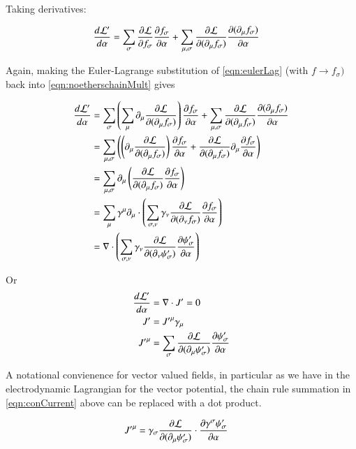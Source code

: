 \documentclass{article}
\begin{document}
Taking derivatives:

\begin{align}\label{eqn:noetherschainMult}
\frac{d\mathcal{L}'}{d\alpha}
&= \sum_\sigma \frac{\partial {\mathcal{L}}}{\partial {f_\sigma}}\frac{\partial {f_\sigma}}{\partial {\alpha}} + \sum_{\mu,\sigma} \frac{\partial {\mathcal{L}}}{\partial {(\partial_\mu f_\sigma)}}\frac{\partial {(\partial_\mu f_\sigma)}}{\partial {\alpha}}
\end{align}

Again, making the Euler-Lagrange substitution of \ref{eqn:eulerLag} (with $f\rightarrow f_\sigma)$ back into \ref{eqn:noetherschainMult} gives

\begin{align*}
\frac{d\mathcal{L}'}{d\alpha}
&= 
\sum_\sigma \left( \sum_\mu \partial_\mu \frac{\partial {\mathcal{L}}}{\partial {(\partial_\mu f_\sigma)}}\right)
\frac{\partial {f_\sigma}}{\partial {\alpha}} + \sum_{\mu,\sigma} \frac{\partial {\mathcal{L}}}{\partial {(\partial_\mu f_\sigma)}}\frac{\partial {(\partial_\mu f_\sigma)}}{\partial {\alpha}} \\
&= 
\sum_{\mu,\sigma} \left( \left( \partial_\mu \frac{\partial {\mathcal{L}}}{\partial {(\partial_\mu f_\sigma)}} \right)
\frac{\partial {f_\sigma}}{\partial {\alpha}} + \frac{\partial {\mathcal{L}}}{\partial {(\partial_\mu f_\sigma)}} \partial_\mu \frac{\partial {f_\sigma}}{\partial {\alpha}} \right) \\
&= \sum_{\mu,\sigma} \partial_\mu \left( \frac{\partial {\mathcal{L}}}{\partial {(\partial_\mu f_\sigma)}} \frac{\partial {f_\sigma}}{\partial {\alpha}} \right) \\
&= \sum_\mu \gamma^\mu \partial_\mu \cdot \left( \sum_{\sigma,\nu} \gamma_\nu \frac{\partial {\mathcal{L}}}{\partial {(\partial_\nu f_\sigma)}} \frac{\partial {f_\sigma}}{\partial {\alpha}} \right) \\
&= \nabla \cdot \left( \sum_{\sigma,\nu} \gamma_\nu \frac{\partial {\mathcal{L}}}{\partial {(\partial_\nu \psi_\sigma')}} \frac{\partial {\psi_\sigma'}}{\partial {\alpha}} \right) \\
\end{align*}

Or
\begin{align}\label{eqn:conCurrent}
\frac{d \mathcal{L}'}{d\alpha} &= \nabla \cdot J' = 0 \\
J' &= {J'}^\mu \gamma_\mu \\
{J'}^\mu &= \sum_\sigma \frac{\partial {\mathcal{L}}}{\partial {(\partial_\mu \psi_\sigma')}} \frac{\partial {\psi_\sigma'}}{\partial {\alpha}} 
\end{align}

A notational convienence for vector valued fields, in particular as we have in the electrodynamic Lagrangian for the vector potential, the chain rule summation in
\ref{eqn:conCurrent} above can be replaced with a dot product.

\begin{align*}
{J'}^\mu &= \gamma_\sigma \frac{\partial {\mathcal{L}}}{\partial {(\partial_\mu \psi_\sigma')}} \cdot \frac{\partial {\gamma^\sigma \psi_\sigma'}}{\partial {\alpha}} 
\end{align*}
\end{document}
